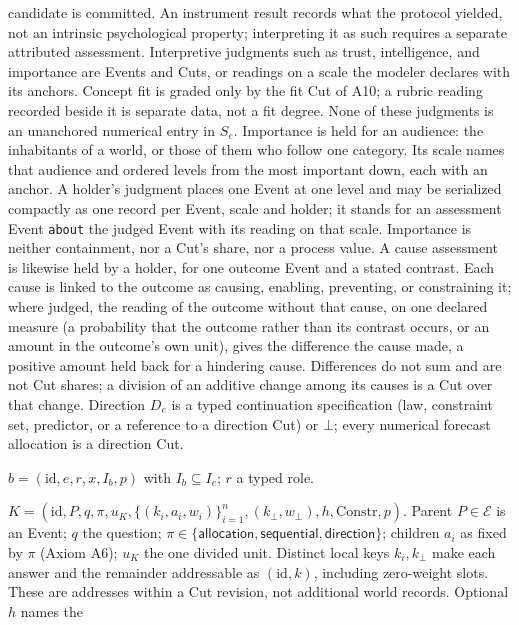 \documentclass[11pt,a4paper]{article}
\newcommand{\Eset}{\mathcal E}
\begin{document}
\begin{description}[style=nextline]
    candidate is committed.
    An instrument result records what the protocol yielded, not an intrinsic
    psychological property; interpreting it as such requires a separate attributed
    assessment. Interpretive judgments such as trust, intelligence, and
    importance are Events and Cuts, or readings on a scale the modeler declares
    with its anchors. Concept fit is graded only by the fit Cut of
    A10; a rubric reading recorded beside it is separate data, not a fit
    degree. None of these judgments is an unanchored numerical entry in $S_e$.
    Importance is held for an audience:
    the inhabitants of a world, or those of them who follow one category. Its
    scale names that audience and ordered levels from the most important down,
    each with an anchor. A holder's judgment places one Event at one level and
    may be serialized compactly as one record per Event, scale and holder; it
    stands for an assessment Event \texttt{about} the judged Event with its
    reading on that scale. Importance is neither containment, nor a Cut's
    share, nor a process value.
    A cause assessment is likewise held by a holder, for one outcome Event and
    a stated contrast. Each cause is linked to the outcome as causing,
    enabling, preventing, or constraining it; where judged, the reading of the
    outcome without that cause, on one declared measure (a probability that
    the outcome rather than its contrast occurs, or an amount in the outcome's
    own unit), gives the difference the cause made, a positive amount held back
    for a hindering cause. Differences do not sum and are not Cut shares; a
    division of an additive change among its causes is a Cut over that change.
    Direction $D_e$ is a typed
    continuation specification (law, constraint set, predictor, or a reference
    to a direction Cut) or $\bot$; every numerical forecast allocation is a
    direction Cut.
  \item[Binding] $b=(\mathrm{id},e,r,x,I_b,p)$ with $I_b\subseteq I_e$; $r$ a typed
    role.
  \item[Cut] $K=(\mathrm{id},P,q,\pi,u_K,
    \{(k_i,a_i,w_i)\}_{i=1}^{n},(k_\bot,w_\bot),h,\mathrm{Constr},p)$. Parent
    $P\in\Eset$ is an Event; $q$ the question;
    $\pi\in\{\textsf{allocation},
    \textsf{sequential},\textsf{direction}\}$; children $a_i$ as fixed by
    $\pi$ (Axiom A6); $u_K$ the one divided unit. Distinct local keys
    $k_i,k_\bot$ make each answer and the remainder addressable as
    $(\mathrm{id},k)$, including zero-weight slots. These are addresses within
    a Cut revision, not additional world records. Optional $h$ names the

\end{description}
\end{document}
